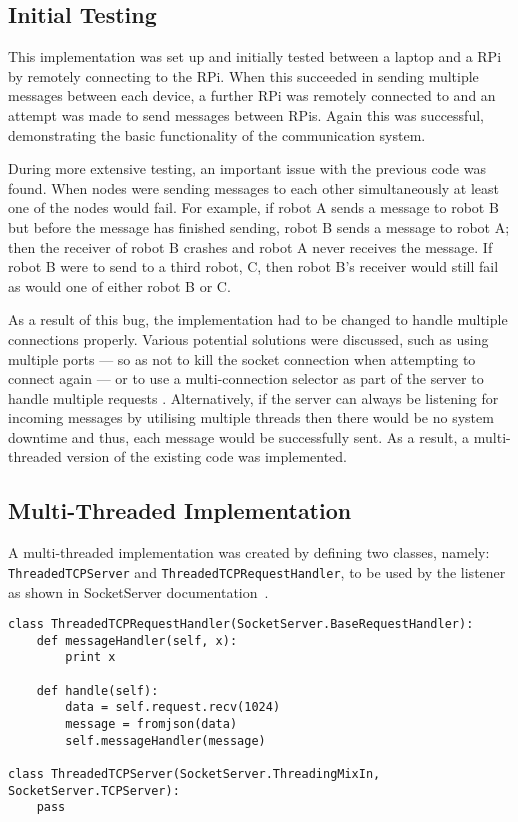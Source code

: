 \subsection{Initial Testing}\label{soft/comms/initest}
This implementation was set up and initially tested between a laptop and a
RPi by remotely connecting to the RPi. When this succeeded in sending
multiple messages between each device, a further RPi was remotely connected to and
an attempt was made to send messages between RPis. Again this was successful,
demonstrating the basic functionality of the communication system.

During more extensive testing, an important issue with the previous
code was found. When nodes were sending messages to each other simultaneously
at least one of the nodes would fail. For example, if robot A sends a message to
robot B but before the message has finished sending, robot B sends a message to
robot A; then the receiver of robot B crashes and robot A never receives the message.
If robot B were to send to a third robot, C, then robot B's receiver would still
fail as would one of either robot B or C.

As a result of this bug, the implementation had to be changed to handle
multiple connections properly. Various potential solutions were discussed,
such as using multiple ports --- so as not to kill the socket connection when
attempting to connect again --- or to use a multi-connection selector as part of
the server to handle multiple requests \cite{multiconnectionServer}.
Alternatively, if the server can always be listening for incoming messages by
utilising multiple threads then there would be no system downtime and
thus, each message would be successfully sent. As a result, a multi-threaded version
of the existing code was implemented.


\subsection{Multi-Threaded Implementation}\label{soft/comms/mtimpl}

A multi-threaded implementation was created by defining two classes, namely: \verb|ThreadedTCPServer| and
\verb|ThreadedTCPRequestHandler|, to be used by the listener as shown in
SocketServer documentation~\cite{socketServerDocs}.

\begin{lstlisting}[caption={ThreadedTCPRequestHandler}, label={lst:comms_tcprequest}]
class ThreadedTCPRequestHandler(SocketServer.BaseRequestHandler):
    def messageHandler(self, x):
        print x

    def handle(self):
        data = self.request.recv(1024)
        message = fromjson(data)
        self.messageHandler(message)

class ThreadedTCPServer(SocketServer.ThreadingMixIn, SocketServer.TCPServer):
    pass
\end{lstlisting}


